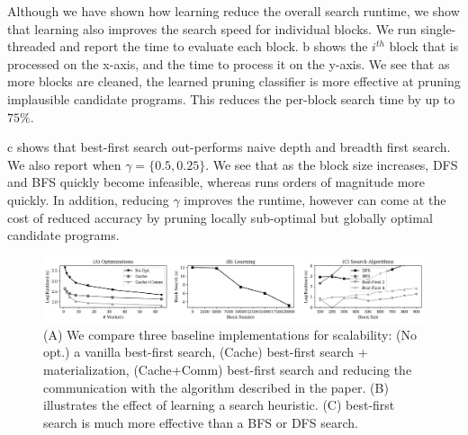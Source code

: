 Although we have shown how learning reduce the overall search runtime, we show that learning also improves the search speed for individual blocks.  We run single-threaded \sys and report the time to evaluate each block.  b shows the $i^{th}$ block that is processed on the x-axis, and the time to process it on the y-axis.   We see that as more blocks are cleaned, the learned pruning classifier is more effective at pruning implausible candidate programs.  This reduces the per-block search time by up to $75\%$.  

 c shows that best-first search out-performs naive depth and breadth first search.  We also report \sys when $\gamma=\{0.5, 0.25\}$.  We see that as the block size increases, DFS and BFS quickly become infeasible, whereas \sys runs orders of magnitude more quickly.  In addition, reducing $\gamma$ improves the runtime, however can come at the cost of reduced accuracy by pruning locally sub-optimal but globally optimal candidate programs.  

 \begin{figure}[ht]
\centering
 \includegraphics[width=\textwidth]{exp/exp6.png}
 \caption{(A) We compare three baseline implementations for scalability: (No opt.) a vanilla best-first search, (Cache) best-first search + materialization, (Cache+Comm) best-first search and reducing the communication with the algorithm described in the paper. (B) illustrates the effect of learning a search heuristic. (C) best-first search is much more effective than a BFS or DFS search.  
 \label{fig:opt}}
\end{figure}

